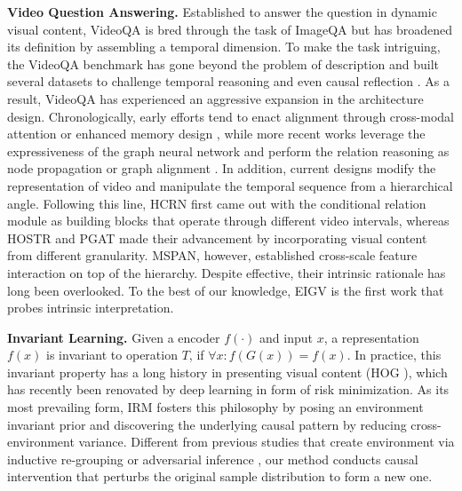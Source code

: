 \vspace{5pt}
\noindent\textbf{Video Question Answering.}
Established to answer the question in dynamic visual content, VideoQA is bred through the task of ImageQA but has broadened its definition by assembling a temporal dimension. 
%
To make the task intriguing, the VideoQA benchmark has gone beyond the problem of description \cite{DBLP:conf/mm/XuZX0Z0Z17} and built several datasets to challenge temporal reasoning and even causal reflection \cite{DBLP:conf/cvpr/XiaoSYC21}. 
%
As a result, VideoQA has experienced an aggressive expansion in the architecture design. 
% 
Chronologically, early efforts tend to enact alignment through cross-modal attention \cite{zeng2016leveraging,li2019beyond} or enhanced memory design \cite{gao2018motionappearance, DBLP:conf/mm/XuZX0Z0Z17, fan2019heterogeneous}, while more recent works leverage the expressiveness of the graph neural network and perform the relation reasoning as node propagation \cite{jiang2020reasoning, DBLP:conf/mm/PengYBW21} or graph alignment \cite{park2021bridge}. 
%
In addition, current designs modify the representation of video and manipulate the temporal sequence from a hierarchical angle. Following this line, HCRN \cite{le2021hierarchical} first came out with the conditional relation module as building blocks that operate through different video intervals, whereas  HOSTR and PGAT made their advancement by incorporating visual content from different granularity. MSPAN, however, established cross-scale feature interaction on top of the hierarchy.
%
Despite effective, their intrinsic rationale has long been overlooked. To the best of our knowledge, EIGV is the first work that probes intrinsic interpretation. 

\vspace{5pt}
\noindent\textbf{Invariant Learning.}
Given a encoder $f(\cdot)$ and input $x$, a representation $f(x)$ is invariant to operation $T$, if $\forall x : f(G(x)) = f(x)$. 
%
In practice, this invariant property has a long history in presenting visual content (\eg HOG \cite{DBLP:conf/mmm/HuangTHTJ11}), which has recently been renovated by deep learning in form of risk minimization. As its most prevailing form, IRM \cite{arjovsky2020invariant} fosters this philosophy by posing an environment invariant prior and discovering the underlying causal pattern by reducing cross-environment variance.   
Different from previous studies that create environment via inductive re-grouping \cite{DBLP:conf/cvpr/AndersonWTB0S0G18} or adversarial inference \cite{DBLP:conf/icml/CreagerJZ21,wang2021causal, wang2022causal,wang2021clicks}, our method conducts causal intervention that perturbs the original sample distribution to form a new one.

